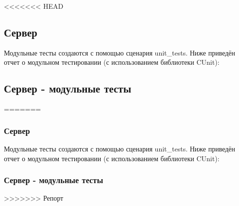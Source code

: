 \documentclass[a4paper,12pt]{report}
\begin{document}
<<<<<<< HEAD
\subsection{Сервер}
Модульные тесты создаются с помощью сценария unit\_tests. Ниже приведён отчет о модульном тестировании (с использованием библиотеки CUnit):
\subsection{Сервер - модульные тесты}
=======
\subsubsection{Сервер}
Модульные тесты создаются с помощью сценария unit\_tests. Ниже приведён отчет о модульном тестировании (с использованием библиотеки CUnit):
\subsubsection{Сервер - модульные тесты}
>>>>>>> Репорт
\end{document}
